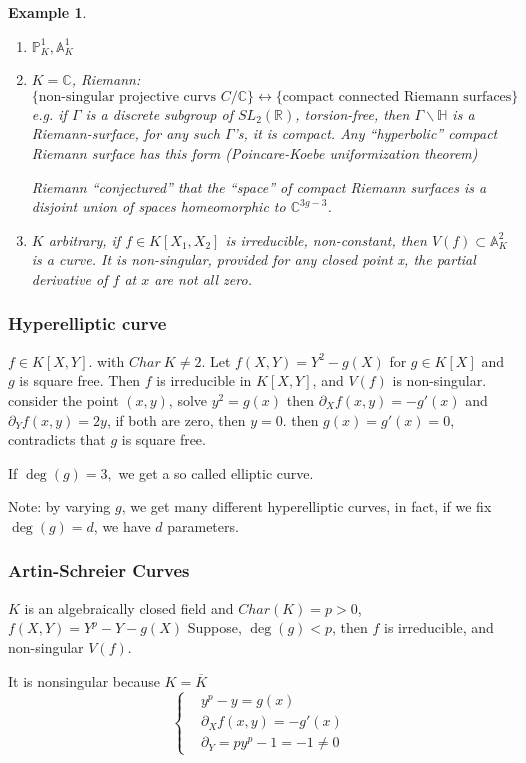 \documentclass[11pt]{article}
\newtheorem{ex}[thm]{Example}
\newcommand{\affn}{\mathbb A}
\newcommand{\proj}{\mathbb P}
\newcommand{\reals}{\mathbb R}
\newcommand{\cplx}{\mathbb C}
\newcommand{\pd}{\partial}
\newcommand{\llrta}{\longleftrightarrow}
\begin{document}
\begin{ex}
\begin{enumerate}[label=(\arabic*)]
\item $\proj^1_K,\affn^1_K$
\item $K=\cplx$, Riemann: 
$$
\{\text{non-singular projective curvs } C/\cplx \}\llrta\{\text{compact connected Riemann surfaces}\}
$$
e.g. if $\Gamma$ is a discrete subgroup of $SL_2(\reals)$, torsion-free, then $\Gamma\backslash \mathbb{H}$ is a Riemann-surface, for any such $\Gamma$'s, it is compact. Any ``hyperbolic'' compact Riemann surface has this form (Poincare-Koebe uniformization theorem)

Riemann ``conjectured'' that the ``space'' of compact Riemann surfaces is a disjoint union of spaces homeomorphic to $\cplx^{3g-3}$.
\item $K$ arbitrary, if $f\in K[X_1,X_2]$ is irreducible, non-constant, then $V(f)\subset \affn^2_K$ is a curve. It is non-singular, provided for any closed point x, the partial derivative of $f$ at $x$ are not all zero.
\end{enumerate}
\end{ex}
\subsubsection{Hyperelliptic curve} $f\in K[X,Y]$. with $Char\ K\neq 2$. Let $f(X,Y)=Y^2-g(X)$ for $g\in K[X]$ and $g$ is square free. Then $f$ is  irreducible in $K[X,Y]$, and $V(f)$ is non-singular. consider the point $(x,y)$, solve $y^2=g(x)$ then $\pd_X f(x,y)=-g'(x)$ and $\pd_Y f(x,y)=2y$, if both are zero, then $y=0$. then $g(x)=g'(x)=0$, contradicts that $g$
is square free.

If $\deg(g)=3,$ we get a so called elliptic curve.

Note: by varying $g$, we get many different hyperelliptic curves, in fact, if we fix $\deg(g)=d$, we have $d$ parameters. 
\subsubsection{Artin-Schreier Curves}
$K$ is an algebraically closed field and
$Char(K)=p> 0$, $f(X,Y)=Y^p-Y-g(X)$
Suppose, $\deg(g)< p$, then $f$ is irreducible, and non-singular $V(f)$.

It is nonsingular  because $K=\overline{K}$
$$
\left\{
\begin{aligned}
& y^p-y=g(x)\\
& \pd_Xf(x,y)=-g'(x)\\
& \pd_Y= p y^p-1=-1\neq 0
\end{aligned}
\right.
$$
\end{document}

